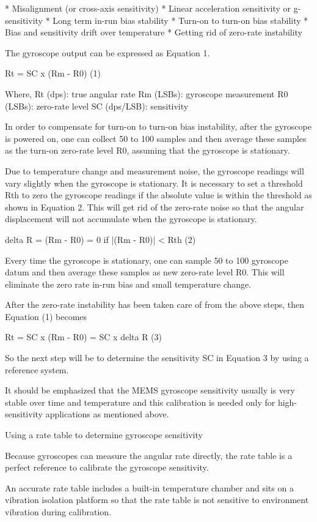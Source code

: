     * Misalignment (or cross-axis sensitivity)
    * Linear acceleration sensitivity or g-sensitivity
    * Long term in-run bias stability
    * Turn-on to turn-on bias stability
    * Bias and sensitivity drift over temperature
    * Getting rid of zero-rate instability

The gyroscope output can be expressed as Equation 1.

Rt = SC x (Rm - R0)     (1)

Where,
 Rt (dps): true angular rate
 Rm  (LSBs): gyroscope measurement
 R0 (LSBs): zero-rate level
 SC (dps/LSB): sensitivity

In order to compensate for turn-on to turn-on bias instability, after the gyroscope is powered on, one can collect 50 to 100 samples and then average these samples as the turn-on zero-rate level R0, assuming that the gyroscope is stationary.

Due to temperature change and measurement noise, the gyroscope readings will vary slightly when the gyroscope is stationary. It is necessary to set a threshold Rth to zero the gyroscope readings if the absolute value is within the threshold as shown in Equation 2. This will get rid of the zero-rate noise so that the angular displacement will not accumulate when the gyroscope is stationary.  

delta R = (Rm - R0) = 0 if |(Rm - R0)| < Rth      (2)

Every time the gyroscope is stationary, one can sample 50 to 100 gyroscope datum and then average these samples as new zero-rate level R0. This will eliminate the zero rate in-run bias and small temperature change.

After the zero-rate instability has been taken care of from the above steps, then Equation (1) becomes

Rt = SC x (Rm - R0) = SC x delta R      (3)

So the next step will be to determine the sensitivity SC in Equation 3 by using a reference system.

It should be emphasized that the MEMS gyroscope sensitivity usually is very stable over time and temperature and this calibration is needed only for high-sensitivity applications as mentioned above.

Using a rate table to determine gyroscope sensitivity

Because gyroscopes can measure the angular rate directly, the rate table is a perfect reference to calibrate the gyroscope sensitivity.

An accurate rate table includes a built-in temperature chamber and sits on a vibration isolation platform so that the rate table is not sensitive to environment vibration during calibration.

